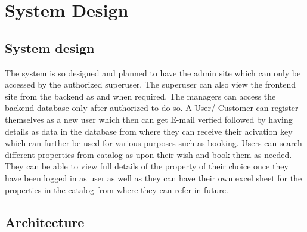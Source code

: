 \documentclass[12pt]{report}
\begin{document}
\chapter{System Design}

\section{System design}
The system is so designed and planned to have the admin site which can
only
be
accessed
by
the
authorized
superuser. The superuser can also view the
frontend site from the backend as and when
required. The managers can access the backend
database only after authorized to do so. A User/
Customer can register themselves as a new user
which then can get E-mail verfied followed by
having details as data in the database from
where they can receive their acivation key which
can further be used for various purposes such as
booking. Users can search different properties
from catalog as upon their wish and book them
as needed. They can be able to view full details
of the property of their choice once they have
been logged in as user as well as they can have
their own excel sheet for the properties in the
catalog from where they can refer in future.


\section{Architecture}
\end{document}
